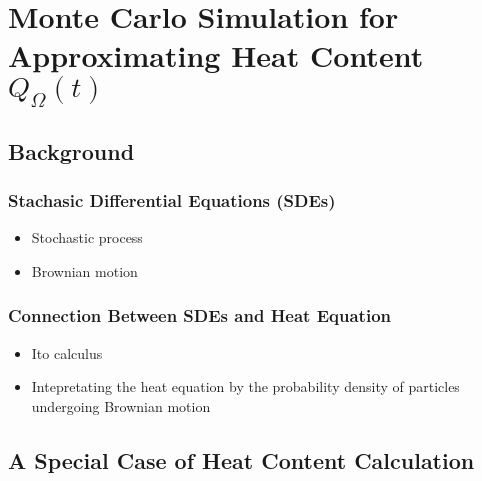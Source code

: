 \section{Monte Carlo Simulation for Approximating Heat Content $Q_{\Omega}(t)$}\label{section:MC_heat_content}


  \subsection{Background \cite{jacobs2010stochastic}}
    \subsubsection{Stachasic Differential Equations (SDEs)}
      \begin{itemize}
        \item Stochastic process
        \item Brownian motion
      \end{itemize}
      
    \subsubsection{Connection Between SDEs and Heat Equation}
      \begin{itemize}
        \item Ito calculus
        \item Intepretating the heat equation by the probability density of particles undergoing Brownian motion
      \end{itemize}
      
  \subsection{A Special Case of Heat Content Calculation}

